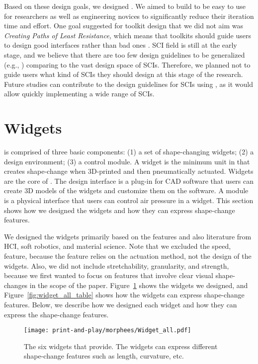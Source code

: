     Based on these design goals, we designed \mp. We aimed to build \mp to be
    easy to use for researchers as well as engineering novices to significantly
    reduce their iteration time and effort. One goal suggested for toolkit
    design that we did not aim was \textit{Creating Paths of Least Resistance,}
    which means that toolkits should guide users to design good interfaces
    rather than bad ones \cite{Myers:2000us, Alexander:2018}.  SCI field is
    still at the early stage, and we believe that there are too few design
    guidelines to be generalized (e.g., \cite{Gronvall:2014, Kim:2019jn,
    Tiab:2016}) comparing to the vast design space of SCIs.  Therefore, we
    planned not to guide users what kind of SCIs they should design at this
    stage of the research.  Future studies can contribute to the design
    guidelines for SCIs using \mp, as it would allow quickly implementing a wide
    range of SCIs.

  \section{\mp Widgets}
    \mp is comprised of three basic components: (1) a set of shape-changing
    widgets; (2) a design environment; (3) a control module. A widget is the
    minimum unit in \mp that creates shape-change when 3D-printed and then
    pneumatically actuated. Widgets are the core of \mp. The design interface is
    a plug-in for CAD software that users can create 3D models of the widgets
    and customize them on the software. A module is a physical interface that
    users can control air pressure in a widget. This section shows how we
    designed the widgets and how they can express shape-change features.
      
    We designed the widgets primarily based on the features and also literature
    from HCI, soft robotics, and material science. Note that we excluded the
    speed, feature, because the feature relies on the actuation method, not the
    design of the widgets. Also, we did not include stretchability, granularity,
    and strength, because we first wanted to focus on features that involve
    clear visual shape-changes in the scope of the paper.
    Figure~\ref{fig:widget_all} shows the widgets we designed, and
    Figure~\ref{fig:widget_all_table} shows how the widgets can express
    shape-change features. Below, we describe how we designed each widget and
    how they can express the shape-change features.
      
    \begin{figure}[htb]
      \centering
      \texttt{[image: print-and-play/morphees/Widget\_all.pdf]}
      \caption{The six widgets that \mp provide. The widgets can express
        different shape-change features such as length, curvature, etc.}
      \label{fig:widget_all}
    \end{figure}
        
